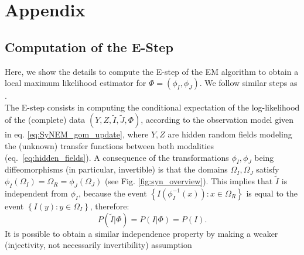 \clearpage
\appendix
{}
\section*{Appendix}
\label{sec:appendix}

\renewcommand{\thesubsection}{\Alph{subsection}}

\subsection{Computation of the E-Step}\label{ap:E_step}
Here, we show the details to compute the E-step of the EM algorithm \citep{Dempster1977} to obtain a local maximum likelihood estimator for $\Phi = (\phi_{I}, \phi_{J})$.
We follow similar steps as \cite{Arce-santana2014}.\\

The E-step \citep{Dempster1977} consists in computing the conditional expectation of the log-likelihood of the (complete) data $(Y, Z, \tilde{I}, \tilde{J}, \Phi)$, according to the observation model given in eq. \eqref{eq:SyNEM_gom_update}, where $Y, Z$ are hidden random fields modeling the (unknown) transfer functions between both modalities \hbox{(eq. \eqref{eq:hidden_fields})}. A consequence of the transformations $\phi_{I}, \phi_{J}$ being diffeomorphisms (in particular, invertible) is that the domains $\Omega_{I}, \Omega_{J}$ satisfy \hbox{$\phi_{I}(\Omega_{I}) = \Omega_{R} = \phi_{J}(\Omega_{J})$} (see Fig. \ref{fig:syn_overview}). This implies that $\tilde{I}$ is independent from $\phi_{I}$, because the event $\left\lbrace I(\phi_{I}^{-1}(x)) : x\in \Omega_{R} \right\rbrace$ is equal to the event $\left\lbrace I(y) : y\in \Omega_{I} \right\rbrace$, therefore:
\begin{equation}\label{eq:image_transform_independence}
     P(\tilde{I} | \Phi) = P(I | \Phi) = P(I).
\end{equation}
It is possible to obtain a similar independence property by making a weaker (injectivity, not necessarily invertibility) assumption \citep[see][pg. 73]{Roche2000}\\

